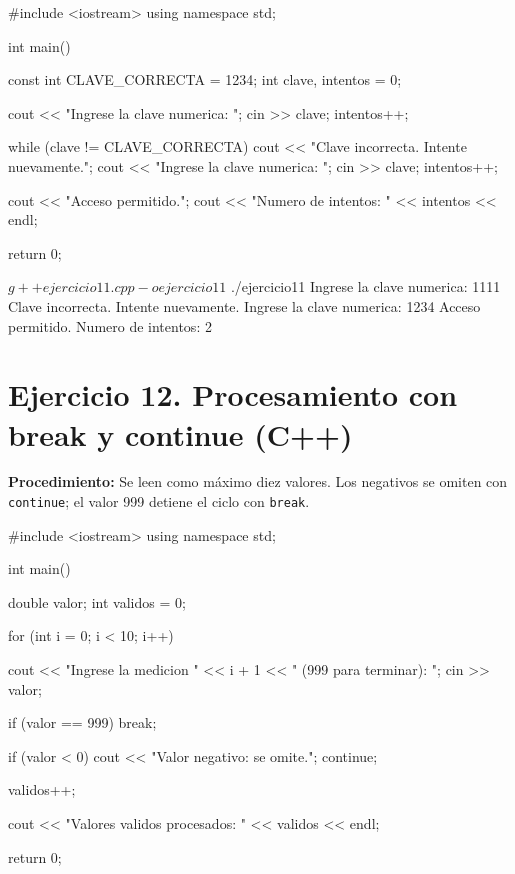 \documentclass[11pt, a4paper]{article}
\begin{document}
\begin{codebox}[title={CÓDIGO FUENTE EN C++: Ejercicio 11}]
#include <iostream>
using namespace std;

int main() {
    const int CLAVE_CORRECTA = 1234;
    int clave, intentos = 0;

    cout << "Ingrese la clave numerica: ";
    cin >> clave;
    intentos++;

    while (clave != CLAVE_CORRECTA) {
        cout << "Clave incorrecta. Intente nuevamente.\n";
        cout << "Ingrese la clave numerica: ";
        cin >> clave;
        intentos++;
    }

    cout << "Acceso permitido.\n";
    cout << "Numero de intentos: " << intentos << endl;

    return 0;
}
\end{codebox}

\begin{terminalout}
$ g++ ejercicio11.cpp -o ejercicio11
$ ./ejercicio11
Ingrese la clave numerica: 1111
Clave incorrecta. Intente nuevamente.
Ingrese la clave numerica: 1234
Acceso permitido.
Numero de intentos: 2
\end{terminalout}

\newpage

\section*{Ejercicio 12. Procesamiento con break y continue (C++)}
\textbf{Procedimiento:} Se leen como máximo diez valores. Los negativos se omiten con \texttt{continue}; el valor 999 detiene el ciclo con \texttt{break}.

\begin{codebox}[title={CÓDIGO FUENTE EN C++: Ejercicio 12}]
#include <iostream>
using namespace std;

int main() {
    double valor;
    int validos = 0;

    for (int i = 0; i < 10; i++) {
        cout << "Ingrese la medicion " << i + 1 << " (999 para terminar): ";
        cin >> valor;

        if (valor == 999) {
            break;
        }

        if (valor < 0) {
            cout << "Valor negativo: se omite.\n";
            continue;
        }

        validos++;
    }

    cout << "Valores validos procesados: " << validos << endl;

    return 0;
}
\end{codebox}
\end{document}
